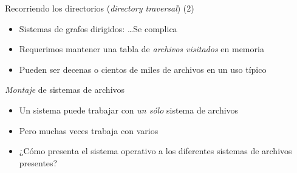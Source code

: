 \documentclass[presentation]{beamer}
\newcommand{\rarrow}{$\rightarrow$\hskip 0.5em}
\begin{document}
\begin{frame}[label={sec:org8200dc9}]{Recorriendo los directorios (\emph{directory traversal}) (2)}
\begin{itemize}
\item Sistemas de grafos dirigidos: \ldots{}Se complica
\end{itemize}
\pause
\begin{itemize}
\item Requerimos mantener una tabla de \emph{archivos visitados} en memoria
\item Pueden ser decenas o cientos de miles de archivos en un uso típico
\end{itemize}
\end{frame}

\begin{frame}[label={sec:org39049a7}]{\emph{Montaje} de sistemas de archivos}
\begin{itemize}
\item Un sistema puede trabajar con \emph{un sólo} sistema de archivos
\item Pero muchas veces trabaja con varios
\item ¿Cómo presenta el sistema operativo a los diferentes sistemas de
archivos presentes?
\end{itemize}
\end{frame}
\end{document}
